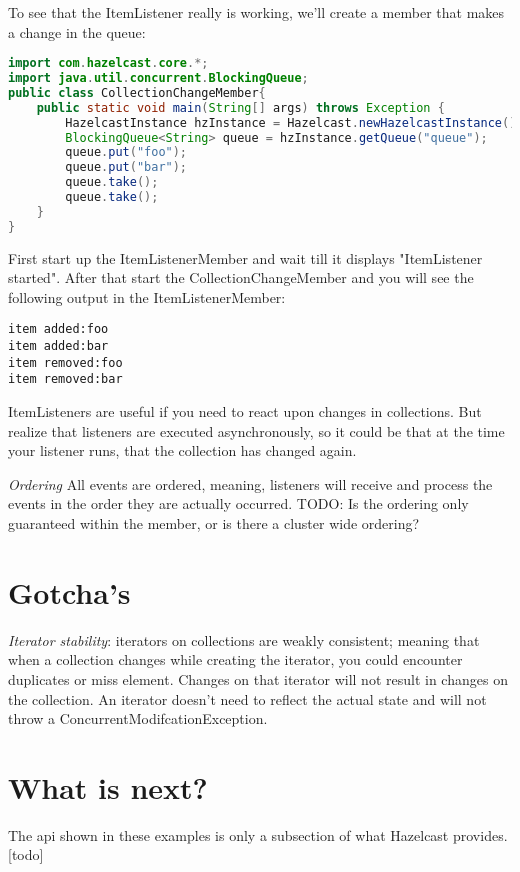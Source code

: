 To see that the ItemListener really is working, we'll create a member that makes a change in the queue:
\begin{lstlisting}[language=java]
import com.hazelcast.core.*;
import java.util.concurrent.BlockingQueue;
public class CollectionChangeMember{
    public static void main(String[] args) throws Exception {
        HazelcastInstance hzInstance = Hazelcast.newHazelcastInstance();
        BlockingQueue<String> queue = hzInstance.getQueue("queue");
        queue.put("foo");
        queue.put("bar");
        queue.take();
        queue.take();
    }
}
\end{lstlisting}
First start up the ItemListenerMember and wait till it displays "ItemListener started". After that start the CollectionChangeMember and you will see the following output in the ItemListenerMember:
\begin{lstlisting}
item added:foo
item added:bar
item removed:foo
item removed:bar
\end{lstlisting}
ItemListeners are useful if you need to react upon changes in collections. But realize that listeners are executed asynchronously, so it could be that at the time your listener runs, that the collection has changed again. 

\emph{Ordering} All events are ordered, meaning, listeners will receive and process the events in the order they are actually occurred. TODO: Is the ordering only guaranteed within the member, or is there a cluster wide ordering?

\section{Gotcha's}

\emph{Iterator stability}: iterators on collections are weakly consistent; meaning that when a collection changes while creating the iterator, you could encounter duplicates or miss element. Changes on that iterator will not result in changes on the collection. An iterator doesn't need to reflect the actual state and will not throw a ConcurrentModifcationException. 

\section{What is next?}
The api shown in these examples is only a subsection of what Hazelcast provides.[todo]